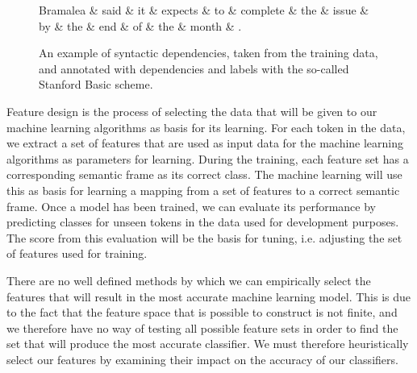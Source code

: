 \begin{figure}
    \centering
    \smaller[]
    \smaller[]
    \begin{dependency}[]
        \begin{deptext}[column sep=0.5em, row sep=.1ex]
            Bramalea \& said \& it \& expects \& to \& complete \& the \& issue \& by \& the \& end \& of \& the \& month \& . \\
        \end{deptext}
    \end{dependency}
    \caption{An example of syntactic dependencies, taken from the training data, and annotated with dependencies and labels with the so-called Stanford Basic scheme.}
    \label{DM:syntactic}
\end{figure}

Feature design is the process of selecting the data that will be given to our machine learning algorithms as basis for its learning. For each token in the data, we extract a set of features that are used as input data for the machine learning algorithms as parameters for learning. During the training, each feature set has a corresponding semantic frame as its correct class. The machine learning will use this as basis for learning a mapping from a set of features to a correct semantic frame. Once a model has been trained, we can evaluate its performance by predicting classes for unseen tokens in the data used for development purposes. The score from this evaluation will be the basis for tuning, i.e. adjusting the set of features used for training.

There are no well defined methods by which we can empirically select the features that will result in the most accurate machine learning model. This is due to the fact that the feature space that is possible to construct is not finite, and we therefore have no way of testing all possible feature sets in order to find the set that will produce the most accurate classifier. We must therefore heuristically select our features by examining their impact on the accuracy of our classifiers.

